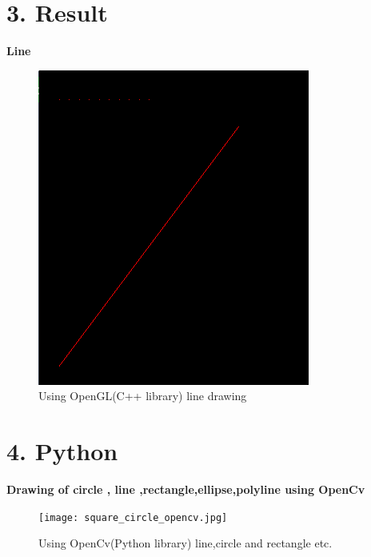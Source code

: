 \documentclass[20pt,letterpaper]{article}
\begin{document}
\section*{3. Result}
    \textbf {\huge Line}
     \begin{figure}[!h]
    \centering
    \includegraphics[width=0.5\linewidth]{openGL_line.jpg}
    \caption{Using OpenGL(C++ library) line drawing}
    \end{figure}

\section*{4. Python}
  \textbf{ Drawing of circle , line ,rectangle,ellipse,polyline using OpenCv}
  \begin{figure}[!h]
    \centering
    \texttt{[image: square\_circle\_opencv.jpg]}
    \caption{Using OpenCv(Python library) line,circle and rectangle etc. }
    \end{figure}
\end{document}
